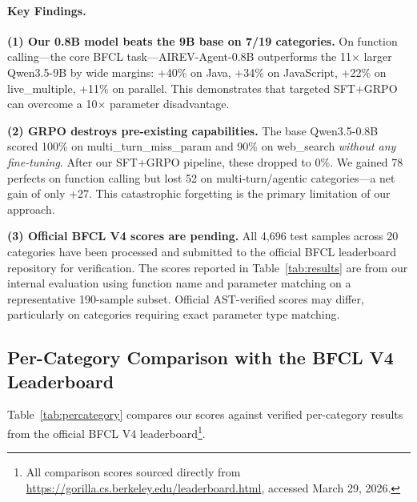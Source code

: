 \documentclass[10pt,twocolumn]{article}
\begin{document}
\paragraph{Key Findings.}

\textbf{(1) Our 0.8B model beats the 9B base on 7/19 categories.} On function calling---the core BFCL task---AIREV-Agent-0.8B outperforms the 11$\times$ larger Qwen3.5-9B by wide margins: +40\% on Java, +34\% on JavaScript, +22\% on live\_multiple, +11\% on parallel. This demonstrates that targeted SFT+GRPO can overcome a 10$\times$ parameter disadvantage.

\textbf{(2) GRPO destroys pre-existing capabilities.} The base Qwen3.5-0.8B scored 100\% on multi\_turn\_miss\_param and 90\% on web\_search \textit{without any fine-tuning}. After our SFT+GRPO pipeline, these dropped to 0\%. We gained 78 perfects on function calling but lost 52 on multi-turn/agentic categories---a net gain of only +27. This catastrophic forgetting is the primary limitation of our approach.

\textbf{(3) Official BFCL V4 scores are pending.} All 4,696 test samples across 20 categories have been processed and submitted to the official BFCL leaderboard repository for verification. The scores reported in Table~\ref{tab:results} are from our internal evaluation using function name and parameter matching on a representative 190-sample subset. Official AST-verified scores may differ, particularly on categories requiring exact parameter type matching.

\subsection{Per-Category Comparison with the BFCL V4 Leaderboard}

Table~\ref{tab:percategory} compares our scores against verified per-category results from the official BFCL V4 leaderboard\footnote{All comparison scores sourced directly from \url{https://gorilla.cs.berkeley.edu/leaderboard.html}, accessed March 29, 2026.}.
\end{document}
